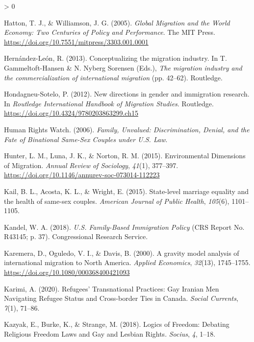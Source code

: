 \documentclass[
  11pt,
]{article}
\newlength{\cslhangindent}
\newenvironment{CSLReferences}[2] %
 {%
  \setlength{\parindent}{0pt}
  \ifodd #1 \everypar{\setlength{\hangindent}{\cslhangindent}}\ignorespaces\fi
  \ifnum #2 > 0
  \setlength{\parskip}{#2\baselineskip}
  \fi
 }%
 {}
\begin{document}
\begin{CSLReferences}{1}{0}
\leavevmode\hypertarget{ref-hatton_2005a}{}%
Hatton, T. J., \& Williamson, J. G. (2005). \emph{Global {Migration} and the {World Economy}: {Two Centuries} of {Policy} and {Performance}}. {The MIT Press}. \url{https://doi.org/10.7551/mitpress/3303.001.0001}

\leavevmode\hypertarget{ref-hernandez-leon_2013}{}%
Hernández-León, R. (2013). Conceptualizing the migration industry. In T. Gammeltoft-Hansen \& N. Nyberg Sorensen (Eds.), \emph{The migration industry and the commercialization of international migration} (pp. 42--62). {Routledge}.

\leavevmode\hypertarget{ref-hondagneu-sotelo_2012}{}%
Hondagneu-Sotelo, P. (2012). New directions in gender and immigration research. In \emph{Routledge {International Handbook} of {Migration Studies}}. {Routledge}. \url{https://doi.org/10.4324/9780203863299.ch15}

\leavevmode\hypertarget{ref-humanrightswatch_2006}{}%
Human Rights Watch. (2006). \emph{Family, {Unvalued}: {Discrimination}, {Denial}, and the {Fate} of {Binational Same}-{Sex Couples} under {U}.{S}. {Law}}.

\leavevmode\hypertarget{ref-hunter_2015}{}%
Hunter, L. M., Luna, J. K., \& Norton, R. M. (2015). Environmental {Dimensions} of {Migration}. \emph{Annual Review of Sociology}, \emph{41}(1), 377--397. \url{https://doi.org/10.1146/annurev-soc-073014-112223}

\leavevmode\hypertarget{ref-kail_2015}{}%
Kail, B. L., Acosta, K. L., \& Wright, E. (2015). State-level marriage equality and the health of same-sex couples. \emph{American Journal of Public Health}, \emph{105}(6), 1101--1105.

\leavevmode\hypertarget{ref-kandel_2018_familybased}{}%
Kandel, W. A. (2018). \emph{U.{S}. {Family}-{Based Immigration Policy}} (CRS Report No. R43145; p. 37). {Congressional Research Service}.

\leavevmode\hypertarget{ref-karemera_2000}{}%
Karemera, D., Oguledo, V. I., \& Davis, B. (2000). A gravity model analysis of international migration to {North America}. \emph{Applied Economics}, \emph{32}(13), 1745--1755. \url{https://doi.org/10.1080/000368400421093}

\leavevmode\hypertarget{ref-karimi_2020}{}%
Karimi, A. (2020). Refugees' {Transnational Practices}: {Gay Iranian Men Navigating Refugee Status} and {Cross}-border {Ties} in {Canada}. \emph{Social Currents}, \emph{7}(1), 71--86.

\leavevmode\hypertarget{ref-kazyak_2018}{}%
Kazyak, E., Burke, K., \& Strange, M. (2018). Logics of {Freedom}: {Debating Religious Freedom Laws} and {Gay} and {Lesbian Rights}. \emph{Socius}, \emph{4}, 1--18.


\end{CSLReferences}
\end{document}
